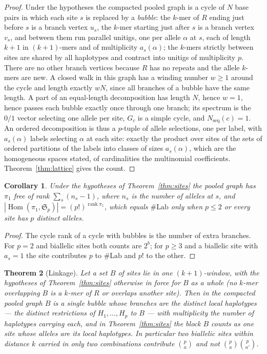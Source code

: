 \documentclass[11pt]{article}
\theoremstyle{plain}
\newtheorem{theorem}{Theorem}
\newtheorem{corollary}[theorem]{Corollary}
\theoremstyle{definition}
\theoremstyle{remark}
\newcommand{\rank}{\operatorname{rank}}
\newcommand{\Hom}{\operatorname{Hom}}
\newcommand{\Nseq}{N_{\mathrm{seq}}}
\newcommand{\Lab}{\#\mathrm{Lab}}
\newcommand{\Sym}{\mathfrak{S}}
\begin{document}
\begin{proof}
Under the hypotheses the compacted pooled graph is a cycle of $N$ base pairs in which each
site $s$ is replaced by a \emph{bubble}: the $k$-mer of $R$ ending just before $s$ is a branch
vertex $u_s$, the $k$-mer starting just after $s$ is a branch vertex $v_s$, and between them
run parallel unitigs, one per allele $\alpha$ at $s$, each of length $k{+}1$ in
$(k{+}1)$-mers and of multiplicity $a_s(\alpha)$; the $k$-mers strictly between sites are
shared by all haplotypes and contract into unitigs of multiplicity $p$. There are no other
branch vertices because $R$ has no repeats and the allele $k$-mers are new. A closed walk in
this graph has a winding number $w\ge1$ around the cycle and length exactly $wN$, since all
branches of a bubble have the same length. A part of an equal-length decomposition has length
$N$, hence $w=1$, hence passes each bubble exactly once through one branch; its spectrum is
the $0/1$ vector selecting one allele per site, $G_c$ is a simple cycle, and $\Nseq(c)=1$.
An ordered decomposition is thus a $p$-tuple of allele selections, one per label, with
$a_s(\alpha)$ labels selecting $\alpha$ at each site: exactly the product over sites of the
sets of ordered partitions of the labels into classes of sizes $a_s(\alpha)$, which are the
homogeneous spaces stated, of cardinalities the multinomial coefficients. Theorem~\ref{thm:lattice}
gives the count.
\end{proof}

\begin{corollary}\label{cor:notH1}
Under the hypotheses of Theorem~\ref{thm:sites} the pooled graph has $\pi_1$ free of rank
$\sum_s(n_s-1)$, where $n_s$ is the number of alleles at $s$, and
$|\Hom(\pi_1,\Sym_p)|=(p!)^{\rank\pi_1}$, which equals $\Lab$ only when $p\le2$ or every
site has $p$ distinct alleles.
\end{corollary}

\begin{proof}
The cycle rank of a cycle with bubbles is the number of extra branches. For $p=2$ and biallelic
sites both counts are $2^b$; for $p\ge3$ and a biallelic site with $a_s=1$ the site
contributes $p$ to $\Lab$ and $p!$ to the other.
\end{proof}

\begin{theorem}[Linkage]\label{thm:linkage}
Let a set $B$ of sites lie in one $(k{+}1)$-window, with the hypotheses of
Theorem~\ref{thm:sites} otherwise in force for $B$ as a whole (no $k$-mer overlapping $B$ is a
$k$-mer of $R$ or overlaps another site). Then in the compacted pooled graph $B$ is a single
bubble whose branches are the distinct \emph{local haplotypes} --- the distinct restrictions
of $H_1,\dots,H_p$ to $B$ --- with multiplicity the number of haplotypes carrying each, and in
Theorem~\ref{thm:sites} the block $B$ counts as one site whose alleles are its local haplotypes.
In particular two biallelic sites within distance $k$ carried in only two combinations
contribute $\binom{p}{a}$ and not $\binom{p}{a}\binom{p}{a'}$.
\end{theorem}
\end{document}
